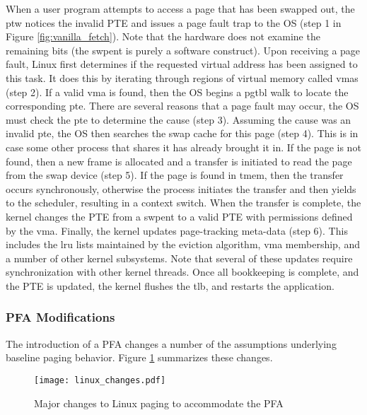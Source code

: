 When a user program attempts to access a page that has been swapped out, the
\gls{ptw} notices the invalid PTE and issues a page fault trap to the OS (step
1 in Figure \ref{fig:vanilla_fetch}). Note that the hardware does not examine
the remaining bits (the \gls{swpent} is purely a software construct). Upon
receiving a page fault, Linux first determines if the requested virtual address
has been assigned to this task. It does this by iterating through regions of
virtual memory called \glspl{vma} (step 2). If a valid \gls{vma} is found, then
the OS begins a \gls{pgtbl} walk to locate the corresponding \gls{pte}. There
are several reasons that a page fault may occur, the OS must check the
\gls{pte} to determine the cause (step 3). Assuming the cause was an invalid
\gls{pte}, the OS then searches the swap cache for this page (step 4). This is
in case some other process that shares it has already brought it in. If the
page is not found, then a new frame is allocated and a transfer is initiated to
read the page from the swap device (step 5). If the page is found in
\gls{tmem}, then the transfer occurs synchronously, otherwise the process
initiates the transfer and then yields to the scheduler, resulting in a context
switch. When the transfer is complete, the kernel changes the PTE from a
\gls{swpent} to a valid PTE with permissions defined by the \gls{vma}. Finally,
the kernel updates page-tracking meta-data (step 6). This includes the \gls{lru} lists
maintained by the eviction algorithm, \gls{vma} membership, and a number of
other kernel subsystems. Note that several of these updates require
synchronization with other kernel threads. Once all bookkeeping is complete,
and the PTE is updated, the kernel flushes the \gls{tlb}, and restarts the
application.

\FloatBarrier 
\subsubsection{PFA Modifications}
The introduction of a PFA changes a number of the assumptions underlying
baseline paging behavior. Figure \ref{fig:linux_changes} summarizes these
changes.

\begin{figure}[h] \centering
  \texttt{[image: linux\_changes.pdf]}
  \caption{Major changes to Linux paging to accommodate the PFA}
  \label{fig:linux_changes}
\end{figure}

